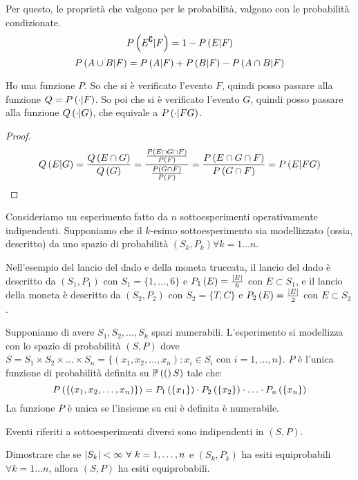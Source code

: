 Per questo, le propriet\`a che valgono per le probabilit\`a, valgono con le probabilit\`a condizionate.
\[
\probcond{E^{\complement}}{F} = 1 - \probcond{E}{F}
\]
\[
\probcond{A \cup B}{F} = \probcond{A}{F} + \probcond{B}{F} - \probcond{A \cap B}{F}
\]
\begin{fact}
Ho una funzione $P$. So che si \`e verificato l'evento $F$, quindi posso passare alla funzione $Q = \probcond{\cdot}{F}$. So poi che si \`e verificato l'evento $G$, quindi posso passare alla funzione $\probcond[Q]{\cdot}{G}$, che equivale a $\probcond{\cdot}{FG}$.
\end{fact}
\begin{proof}
\[
\probcond[Q]{E}{G} = \frac{\prob[Q]{E \cap G}}{\prob[Q]{G}} = \frac{\frac{\prob{E \cap G \cap F}}{\prob{F}}}{\frac{\prob{G \cap F}}{\prob{F}}} = \frac{\prob{E \cap G \cap F}}{\prob{G \cap F}} = \probcond{E}{FG}
\]
\end{proof}

Consideriamo un esperimento fatto da $n$ sottoesperimenti operativamente indipendenti. Supponiamo che il $k$-esimo sottoesperimento sia modellizzato (ossia, descritto) da uno spazio di probabilit\`a $(S_k, P_k) \forall k = 1 \ldots n$.

Nell'esempio del lancio del dado e della moneta truccata, il lancio del dado \`e descritto da $(S_1, P_1)$ con $S_1 = \{ 1, \ldots, 6 \}$ e $\prob[P_1]{E} = \frac{\abs{E}}{6}$ con $E \subset S_1$, e il lancio della moneta \`e descritto da $(S_2, P_2)$ con $S_2 = \{ T, C \}$ e $\prob[P_2]{E} = \frac{\abs{E}}{2}$ con $E \subset S_2$.

Supponiamo di avere $S_1, S_2, \ldots, S_k$ spazi numerabili. L'esperimento si modellizza con lo spazio di probabilit\`a $(S, P)$ dove $S = S_1 \times S_2 \times \ldots \times S_n = \{ (x_1, x_2, \ldots, x_n) : x_i \in S_i$ con $i = 1, \ldots, n \}$. $P$ \`e l'unica funzione di probabilit\`a definita su $\parts(S)$ tale che:
\[
\prob{\{(x_1, x_2, \ldots, x_n)\}} = \prob[P_1]{\{x_1\}} \cdot \prob[P_2]{\{x_2\}} \cdot \ldots \cdot \prob[P_n]{\{x_n\}}
\]
La funzione $P$ \`e unica se l'insieme su cui \`e definita \`e numerabile.

Eventi riferiti a sottoesperimenti diversi sono indipendenti in $(S, P)$.

\begin{esercizio}
Dimostrare che se $\abs{S_k} < \infty \forall  k = 1, \ldots, n$ e $(S_k, P_k)$ ha esiti equiprobabili $\forall  k = 1 \dots n$, allora $(S,P)$ ha esiti equiprobabili.
\end{esercizio}

